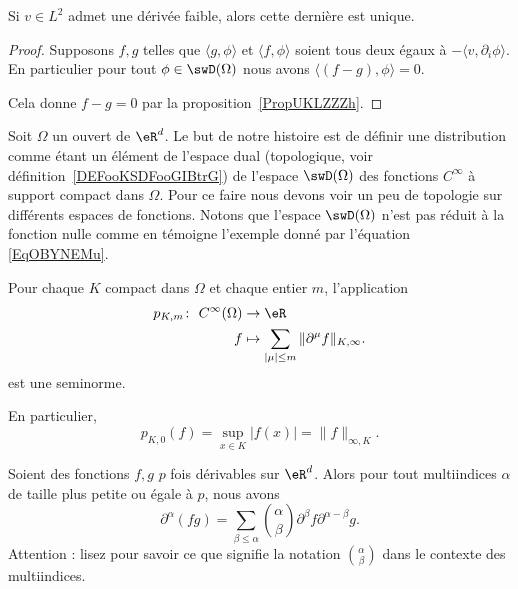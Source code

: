 \begin{lemma}
	Si \( v\in L^2\) admet une dérivée faible, alors cette dernière est unique.
\end{lemma}

\begin{proof}
	Supposons \( f,g\) telles que \( \langle g, \phi\rangle \) et \( \langle f, \phi\rangle \) soient tous deux égaux à \( -\langle v, \partial_i\phi\rangle \). En particulier pour tout \( \phi\in  \swD(\Omega)\) nous avons \( \langle (f-g), \phi\rangle =0\).

	Cela donne \( f-g=0\) par la proposition~\ref{PropUKLZZZh}.
\end{proof}

Soit \( \Omega\) un ouvert de \( \eR^d\). Le but de notre histoire est de définir une distribution comme étant un élément de l'espace dual (topologique, voir définition~\ref{DEFooKSDFooGIBtrG}) de l'espace \( \swD(\Omega)\) des fonctions \( C^{\infty}\) à support compact dans \( \Omega\). Pour ce faire nous devons voir un peu de topologie sur différents espaces de fonctions. Notons que l'espace \( \swD(\Omega)\) n'est pas réduit à la fonction nulle comme en témoigne l'exemple donné par l'équation \eqref{EqOBYNEMu}.

\begin{propositionDef}     \label{PROPooVZFHooKfSpfO}      %
	Pour chaque \( K\) compact dans \( \Omega\) et chaque entier \( m\), l'application
	\begin{equation}  \label{EQooZSQUooAJRIFe}
		\begin{aligned}
			p_{K,m}\colon \ C^{\infty}(\Omega) & \to \eR                                                        \\
			f                                  & \mapsto  \sum_{| \mu |\leq m}\| \partial^{\mu}f \|_{K,\infty}.
		\end{aligned}
	\end{equation}
	est une seminorme.
\end{propositionDef}

En particulier,
\begin{equation}
	p_{K,0}(f)=\sup_{x\in K}| f(x) |=\| f \|_{\infty,K}.
\end{equation}

\begin{lemma}      \label{LEMooOLQTooEHJuBc}
	Soient des fonctions \( f,g\) \( p\) fois dérivables sur \( \eR^d\). Alors pour tout multiindices \( \alpha\) de taille plus petite ou égale à \( p\), nous avons
	\begin{equation}
		\partial^{\alpha}(fg)=\sum_{\beta\leq \alpha}\binom{ \alpha }{ \beta }\partial^{\beta}f\partial^{\alpha-\beta}g.
	\end{equation}
	Attention : lisez \cite{BIBooYDMJooGDtdbo} pour savoir ce que signifie la notation \( \binom{ \alpha }{ \beta } \) dans le contexte des multiindices.
\end{lemma}

